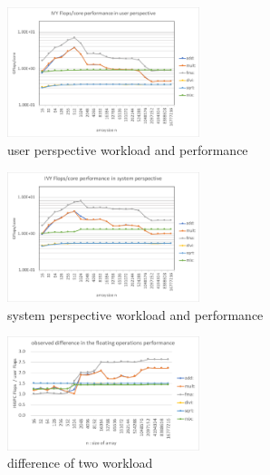 \documentclass[conference]{IEEEtran}
\begin{document}
\begin{figure}[tb]
\includegraphics[width=0.5\textwidth]{figs/workload-ivy-user.pdf}
\caption{user perspective workload and performance}
\label{fig:workload-user}
\end{figure}
\begin{figure}[tb]
\includegraphics[width=0.5\textwidth]{figs/workload-ivy-system.pdf}
\caption{system perspective workload and performance}
\label{fig:workload-system}
\end{figure}
%
\begin{figure}[tb]
\includegraphics[width=0.5\textwidth]{figs/workload-ivy-difference.pdf}
\caption{difference of two workload}
\label{fig:workload-difference}
\end{figure}
\end{document}
